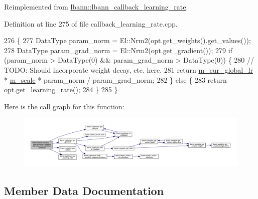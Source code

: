 Reimplemented from \hyperlink{classlbann_1_1lbann__callback__learning__rate_acf7f3921a68e7f1f772106e18c545345}{lbann\+::lbann\+\_\+callback\+\_\+learning\+\_\+rate}.



Definition at line 275 of file callback\+\_\+learning\+\_\+rate.\+cpp.


\begin{DoxyCode}
276                             \{
277   DataType param\_norm = El::Nrm2(opt.get\_weights().get\_values());
278   DataType param\_grad\_norm = El::Nrm2(opt.get\_gradient());
279   \textcolor{keywordflow}{if} (param\_norm > DataType(0) && param\_grad\_norm > DataType(0)) \{
280     \textcolor{comment}{// TODO: Should incorporate weight decay, etc. here.}
281     \textcolor{keywordflow}{return} \hyperlink{classlbann_1_1lbann__callback__learning__rate_a97194f282c29a748c915d9811a8a99fb}{m\_cur\_global\_lr} * \hyperlink{classlbann_1_1lbann__callback__optimizerwise__adaptive__learning__rate_a332beb0eb4464929248f56e1815d4e69}{m\_scale} * param\_norm / param\_grad\_norm;
282   \} \textcolor{keywordflow}{else} \{
283     \textcolor{keywordflow}{return} opt.get\_learning\_rate();
284   \}
285 \}
\end{DoxyCode}
Here is the call graph for this function\+:\nopagebreak
\begin{figure}[H]
\begin{center}
\leavevmode
\includegraphics[width=350pt]{classlbann_1_1lbann__callback__optimizerwise__adaptive__learning__rate_aa9ce00b0ad1fefb20a1108d1120e82d5_cgraph}
\end{center}
\end{figure}


\subsection{Member Data Documentation}
\mbox{\label{classlbann_1_1lbann__callback__optimizerwise__adaptive__learning__rate_a332beb0eb4464929248f56e1815d4e69}} 

